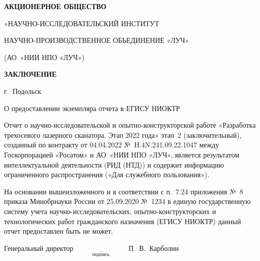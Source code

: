 
\thispagestyle{empty}
\begin{center}
\large\bfseries
АКЦИОНЕРНОЕ ОБЩЕСТВО

«НАУЧНО-ИССЛЕДОВАТЕЛЬСКИЙ ИНСТИТУТ

НАУЧНО-ПРОИЗВОДСТВЕННОЕ ОБЬЕДИНЕНИЕ «ЛУЧ»

(АО~«НИИ НПО «ЛУЧ»)
\end{center}

\begin{center}
\Large\bfseries
ЗАКЛЮЧЕНИЕ
\end{center}

\begin{center}
г.~Подольск

\vspace{1cm}

О предоставлении экземпляра отчета в ЕГИСУ НИОКТР
\end{center}

Отчет о научно-исследовательской и опытно-конструкторской работе «Разработка трехосевого лазерного сканатора. Этап 2022 года» этап~2 (заключительный), созданный по контракту от 04.04.2022 №~H.4N.241.09.22.1047 между Госкорпорацией «Росатом» и АО~«НИИ НПО «ЛУЧ», является результатом интеллектуальной деятельности (РИД (НТД)) и содержит информацию ограниченного распространения («Для служебного пользования»).

На основании вышеизложенного и в соответствии с п.~7.24 приложения №~8 приказа Минобрнауки России от 25.09.2020 №~1234 в единую государственную систему учета научно-исследовательских, опытно-конструкторских и технологических работ гражданского назначения (ЕГИСУ НИОКТР) данный отчет предоставлен быть не может.

\vfill
\noindent Генеральный директор \hspace{1cm} \(\underset{\text{подпись}}{\underline{\hspace{3cm}}}\) \hspace{0.5cm} П.~В.~Карболин

